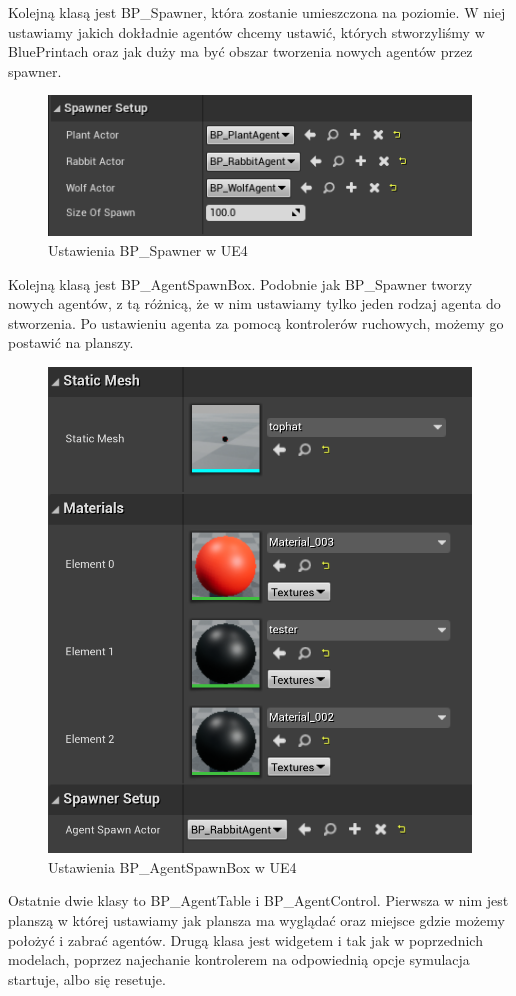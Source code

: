 \documentclass[a4paper,12pt,reqno]{article}
\begin{document}
Kolejną klasą jest BP\_Spawner, która zostanie umieszczona na poziomie. W niej ustawiamy jakich dokładnie agentów chcemy ustawić, których stworzyliśmy w BluePrintach oraz jak duży ma być obszar tworzenia nowych agentów przez spawner.

\begin{figure}[H]%
\centering
\includegraphics[width=0.6\columnwidth]{graphics//agent/BP_SpawnerAgent.png}
\caption{Ustawienia BP\_Spawner w UE4 
\label{BPExample}}%
%
\qquad
\end{figure} 

Kolejną klasą jest BP\_AgentSpawnBox. Podobnie jak BP\_Spawner tworzy nowych agentów, z tą różnicą, że w nim ustawiamy tylko jeden rodzaj agenta do stworzenia. Po ustawieniu agenta za pomocą kontrolerów ruchowych, możemy go postawić na planszy.

\begin{figure}[H]%
\centering
\includegraphics[width=0.60\columnwidth]{graphics//agent/BP_AgentSpawnBox.png}
\caption{Ustawienia  BP\_AgentSpawnBox w UE4 
\label{BPExample}}%
%
\qquad
\end{figure} 

Ostatnie dwie klasy to BP\_AgentTable i BP\_AgentControl. Pierwsza w nim jest planszą w której ustawiamy jak plansza ma wyglądać oraz miejsce gdzie możemy położyć i zabrać agentów. Drugą klasa jest widgetem i tak jak w poprzednich modelach, poprzez najechanie kontrolerem na odpowiednią opcje symulacja startuje, albo się resetuje.
\end{document}

